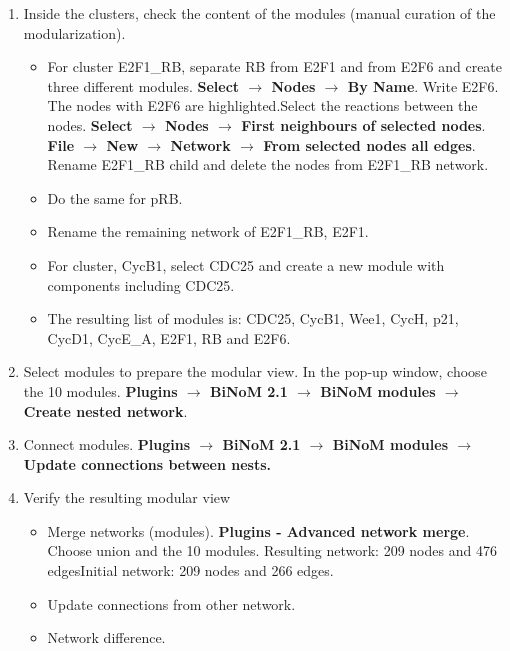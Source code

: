 \documentclass[a4paper,10pt]{article}
\begin{document}
\begin{enumerate}
\item	Inside the clusters, check the content of the modules (manual curation
of the modularization).

\begin{itemize}
\item	For cluster E2F1\_RB, separate RB from E2F1 and from E2F6 and create
three different modules. \textbf{Select $\rightarrow$ Nodes $\rightarrow$ By Name}. Write E2F6. The
nodes with E2F6 are highlighted.Select the reactions between the nodes.
\textbf{Select $\rightarrow$ Nodes $\rightarrow$ First neighbours of selected nodes}. \textbf{File $\rightarrow$ New
 $\rightarrow$ Network $\rightarrow$ From selected nodes all edges}. Rename E2F1\_RB child and delete the
nodes from E2F1\_RB network.
\item	Do the same for pRB.
\item	Rename the remaining network of E2F1\_RB, E2F1.
\item	For cluster, CycB1, select CDC25 and create a new module with components
including CDC25.
\item	The resulting list of modules is: CDC25, CycB1, Wee1, CycH, p21, CycD1,
CycE\_A, E2F1, RB and E2F6.
\end{itemize}

\item	Select modules to prepare the modular view. In the pop-up window, choose
the 10 modules. \textbf{Plugins $\rightarrow$  BiNoM 2.1 $\rightarrow$ BiNoM modules $\rightarrow$ Create nested network}.
\item	Connect modules. \textbf{Plugins $\rightarrow$  BiNoM 2.1 $\rightarrow$ BiNoM modules $\rightarrow$ Update connections between
nests.}
\item   Verify the resulting modular view

\begin{itemize}
\item	Merge networks (modules). \textbf{Plugins - Advanced network merge}.
Choose union and the 10 modules. Resulting network: 209 nodes and 476
edgesInitial network: 209 nodes and 266 edges.

\item	Update connections from other network.
\item	Network difference.
\end{itemize}

\end{enumerate}
 

\end{document}
